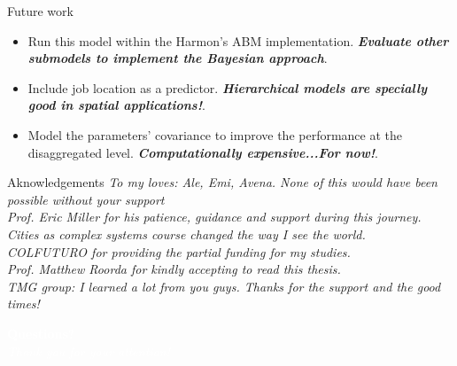 \documentclass[aspectratio=169, xcolor=dvipsnames]{beamer}
\begin{document}
\begin{frame}{Future work}
    \begin{itemize}
        \item \fontsize{10pt}{12pt}\selectfont Run this model within the Harmon's ABM implementation. \textbf{\textit{Evaluate other submodels to implement the Bayesian approach}}.
        \item \fontsize{10pt}{12pt}\selectfont Include job location as a predictor. \textbf{\textit{Hierarchical models are specially good in spatial applications!}}.
        \item \fontsize{10pt}{12pt}\selectfont Model the parameters' covariance to improve the performance at the disaggregated level. \textbf{\textit{Computationally expensive...For now!}}.
    \end{itemize}
\end{frame}

\begin{frame}{Aknowledgements}
    \fontsize{10pt}{12pt}\selectfont \textit{To my loves: Ale, Emi, Avena. None of this would have been possible without your support}\\
    \vspace{20pt}
    \fontsize{10pt}{12pt}\selectfont \textit{Prof. Eric Miller for his patience, guidance and support during this journey. Cities as complex systems course changed the way I see the world.}\\
    \vspace{20pt}
    \fontsize{10pt}{12pt}\selectfont \textit{COLFUTURO for providing the partial funding for my studies.}\\
    \vspace{20pt}
    \fontsize{10pt}{12pt}\selectfont \textit{Prof. Matthew Roorda for kindly accepting to read this thesis.}\\
    \vspace{20pt}
    \fontsize{10pt}{12pt}\selectfont \textit{TMG group: I learned a lot from you guys. Thanks for the support and the good times!}
\end{frame}

{
\begin{frame}
    \begin{center}
        \textcolor{white}{{\fontsize{22pt}{14pt}\selectfont \textbf{Questions?}}}\\
        \vspace{20pt}
        \textcolor{white}{{\fontsize{14pt}{10pt}\selectfont \textsl{Thank you for your attention!}}}
    \end{center}
\end{frame}
}
\end{document}
